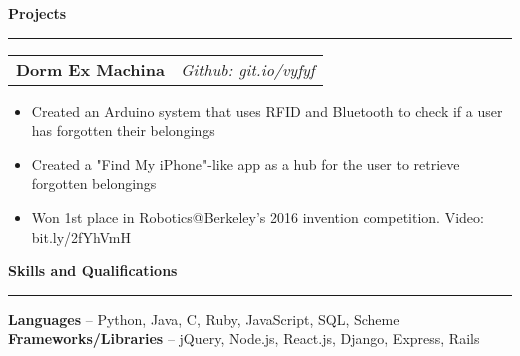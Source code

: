\documentclass[11pt,letterpaper]{article}
\makeatletter
\newenvironment{topic}[1]
    {
    {\Large \centerline{#1}}
    \vspace*{0.03in}
    \hrule 
    \vspace*{0.05in}
    }
    {}
\newenvironment{event}
    {
    \begin{tabular*}{\textwidth}{l@{\extracolsep{\fill}}r}
    }
    {
    \end{tabular*}
    }
\newenvironment{detail}
    {
    \normalsize
    }
    {
    \vspace*{0.02in}
    }
\makeatother
\begin{document}
\begin{topic}{\textbf{Projects}}
        \begin{event}
            \textbf{Dorm Ex Machina} & \emph{Github: git.io/vyfyf}
        \end{event}
            \begin{itemize}
                \item Created an Arduino system that uses RFID and Bluetooth to check if a user has forgotten their belongings
                \item Created a "Find My iPhone"-like app as a hub for the user to retrieve forgotten belongings
                \item Won 1st place in Robotics@Berkeley's 2016 invention competition. Video: bit.ly/2fYhVmH
            \end{itemize}
        
    \end{topic} \vspace*{0.1in}










    \begin{topic}{\textbf{Skills and Qualifications}}
        \begin{detail}
            \textbf{Languages} -- Python, Java, C, Ruby, JavaScript, SQL, Scheme \\
            \textbf{Frameworks/Libraries} -- jQuery, Node.js, React.js, Django, Express, Rails
        \end{detail}
    \end{topic}
\end{document}
